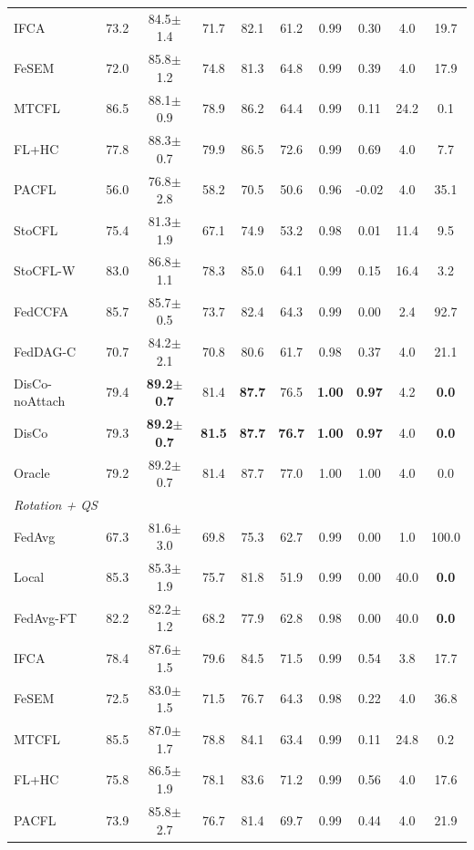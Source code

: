 \begin{tabular}{lccccccccc}
IFCA & 73.2 & 84.5$\pm$1.4 & 71.7 & 82.1 & 61.2 & 0.99 & 0.30 & 4.0 & 19.7 \\
FeSEM & 72.0 & 85.8$\pm$1.2 & 74.8 & 81.3 & 64.8 & 0.99 & 0.39 & 4.0 & 17.9 \\
MTCFL & 86.5 & 88.1$\pm$0.9 & 78.9 & 86.2 & 64.4 & 0.99 & 0.11 & 24.2 & 0.1 \\
FL+HC & 77.8 & 88.3$\pm$0.7 & 79.9 & 86.5 & 72.6 & 0.99 & 0.69 & 4.0 & 7.7 \\
PACFL & 56.0 & 76.8$\pm$2.8 & 58.2 & 70.5 & 50.6 & 0.96 & -0.02 & 4.0 & 35.1 \\
StoCFL & 75.4 & 81.3$\pm$1.9 & 67.1 & 74.9 & 53.2 & 0.98 & 0.01 & 11.4 & 9.5 \\
StoCFL-W & 83.0 & 86.8$\pm$1.1 & 78.3 & 85.0 & 64.1 & 0.99 & 0.15 & 16.4 & 3.2 \\
FedCCFA & 85.7 & 85.7$\pm$0.5 & 73.7 & 82.4 & 64.3 & 0.99 & 0.00 & 2.4 & 92.7 \\
FedDAG-C & 70.7 & 84.2$\pm$2.1 & 70.8 & 80.6 & 61.7 & 0.98 & 0.37 & 4.0 & 21.1 \\
DisCo-noAttach & 79.4 & \textbf{89.2$\pm$0.7} & 81.4 & \textbf{87.7} & 76.5 & \textbf{1.00} & \textbf{0.97} & 4.2 & \textbf{0.0} \\
DisCo & 79.3 & \textbf{89.2$\pm$0.7} & \textbf{81.5} & \textbf{87.7} & \textbf{76.7} & \textbf{1.00} & \textbf{0.97} & 4.0 & \textbf{0.0} \\
Oracle & 79.2 & 89.2$\pm$0.7 & 81.4 & 87.7 & 77.0 & 1.00 & 1.00 & 4.0 & 0.0 \\
\midrule
\multicolumn{10}{l}{\textit{Rotation + QS}}\\
FedAvg & 67.3 & 81.6$\pm$3.0 & 69.8 & 75.3 & 62.7 & 0.99 & 0.00 & 1.0 & 100.0 \\
Local & 85.3 & 85.3$\pm$1.9 & 75.7 & 81.8 & 51.9 & 0.99 & 0.00 & 40.0 & \textbf{0.0} \\
FedAvg-FT & 82.2 & 82.2$\pm$1.2 & 68.2 & 77.9 & 62.8 & 0.98 & 0.00 & 40.0 & \textbf{0.0} \\
IFCA & 78.4 & 87.6$\pm$1.5 & 79.6 & 84.5 & 71.5 & 0.99 & 0.54 & 3.8 & 17.7 \\
FeSEM & 72.5 & 83.0$\pm$1.5 & 71.5 & 76.7 & 64.3 & 0.98 & 0.22 & 4.0 & 36.8 \\
MTCFL & 85.5 & 87.0$\pm$1.7 & 78.8 & 84.1 & 63.4 & 0.99 & 0.11 & 24.8 & 0.2 \\
FL+HC & 75.8 & 86.5$\pm$1.9 & 78.1 & 83.6 & 71.2 & 0.99 & 0.56 & 4.0 & 17.6 \\
PACFL & 73.9 & 85.8$\pm$2.7 & 76.7 & 81.4 & 69.7 & 0.99 & 0.44 & 4.0 & 21.9 \\

\end{tabular}
